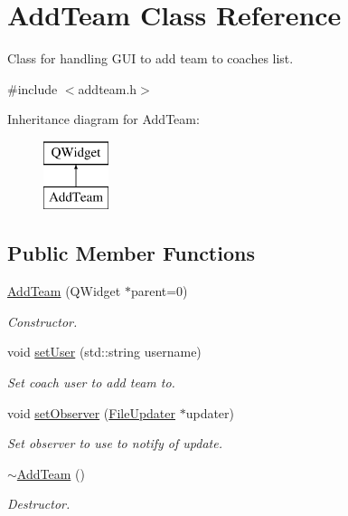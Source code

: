 \hypertarget{classAddTeam}{}\section{Add\+Team Class Reference}
\label{classAddTeam}


Class for handling G\+UI to add team to coaches list.  




{\ttfamily \#include $<$addteam.\+h$>$}

Inheritance diagram for Add\+Team\+:\begin{figure}[H]
\begin{center}
\leavevmode
\includegraphics[height=2.000000cm]{classAddTeam}
\end{center}
\end{figure}
\subsection*{Public Member Functions}
\begin{DoxyCompactItemize}
\item 
\mbox{\hyperlink{classAddTeam_a0bbfb0f776a510c1e0ae8c6969f47a33}{Add\+Team}} (Q\+Widget $\ast$parent=0)
\begin{DoxyCompactList}\small\item\em Constructor. \end{DoxyCompactList}\item 
void \mbox{\hyperlink{classAddTeam_a6b726fb565e134749f0188e24e11d419}{set\+User}} (std\+::string username)
\begin{DoxyCompactList}\small\item\em Set coach user to add team to. \end{DoxyCompactList}\item 
void \mbox{\hyperlink{classAddTeam_a1ce8fbae7abacd854edcd4ef46bc541a}{set\+Observer}} (\mbox{\hyperlink{classFileUpdater}{File\+Updater}} $\ast$updater)
\begin{DoxyCompactList}\small\item\em Set observer to use to notify of update. \end{DoxyCompactList}\item 
\mbox{\hyperlink{classAddTeam_a8e492e3b6d3a7ab160c76cdf81448627}{$\sim$\+Add\+Team}} ()
\begin{DoxyCompactList}\small\item\em Destructor. \end{DoxyCompactList}\end{DoxyCompactItemize}


